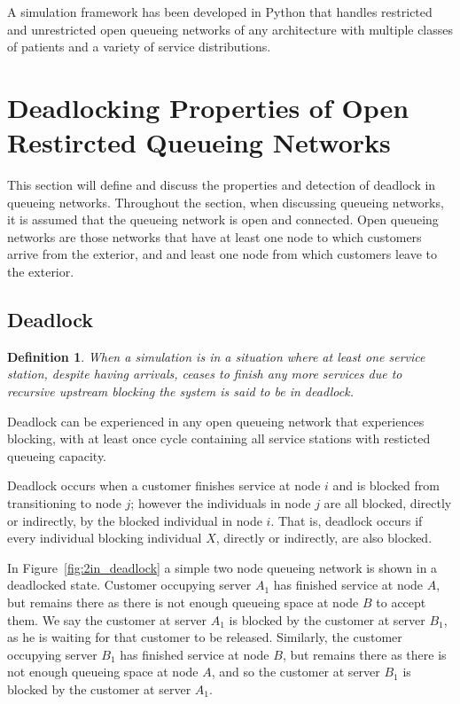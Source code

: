 \documentclass{article}
\newtheorem{definition}{Definition}
\begin{document}
A simulation framework has been developed in Python that handles restricted and unrestricted open queueing networks of any architecture with multiple classes of patients and a variety of service distributions.



\section{Deadlocking Properties of Open Restircted Queueing Networks}

This section will define and discuss the properties and detection of deadlock in queueing networks.
Throughout the section, when discussing queueing networks, it is assumed that
the queueing network is open and connected.
Open queueing networks are those networks that have at least one node to which customers arrive from the exterior, and and least one node from which customers leave to the exterior.

\subsection{Deadlock}

\begin{definition}
    When a simulation is in a situation where at least one service station,
    despite having arrivals, ceases to finish any more services
    due to recursive upstream blocking the system is said to be in deadlock.
\end{definition}

Deadlock can be experienced in any open queueing network that experiences
blocking, with at least once cycle containing all service stations with
resticted queueing capacity.

Deadlock occurs when a customer finishes service at node $i$ and is blocked from transitioning to node $j$; however the individuals in node $j$ are all blocked, directly or indirectly, by the blocked individual in node $i$.
That is, deadlock occurs if every individual blocking individual $X$, directly or indirectly, are also blocked.

In Figure~\ref{fig:2in_deadlock} a simple two node queueing network is shown in a deadlocked state.
Customer occupying server $A_1$ has finished service at node $A$, but remains there as there is not
enough queueing space at node $B$ to accept them.
We say the customer at server $A_1$ is blocked by the customer at server $B_1$, as he is waiting for that customer to be released.
Similarly, the customer occupying server $B_1$ has finished service at node $B$, but remains there as there is not enough queueing space at node $A$, and so the customer at server $B_1$ is blocked by the customer at server $A_1$.
\end{document}
